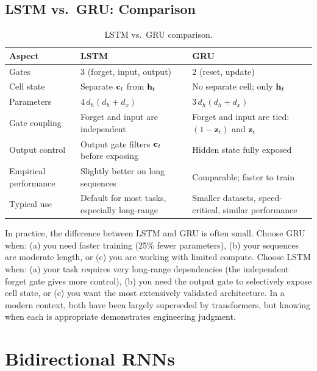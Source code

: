 \subsection{LSTM vs.\ GRU: Comparison}

\begin{table}[H]
\centering
\caption{LSTM vs.\ GRU comparison.}
\label{tab:lstm_gru}
\begin{tabularx}{\textwidth}{lXX}
\toprule
\textbf{Aspect} & \textbf{LSTM} & \textbf{GRU} \\
\midrule
Gates & 3 (forget, input, output) & 2 (reset, update) \\
Cell state & Separate $\mathbf{c}_t$ from $\mathbf{h}_t$ & No separate cell; only $\mathbf{h}_t$ \\
Parameters & $4\,d_h(d_h + d_x)$ & $3\,d_h(d_h + d_x)$ \\
Gate coupling & Forget and input are independent & Forget and input are tied: $(1-\mathbf{z}_t)$ and $\mathbf{z}_t$ \\
Output control & Output gate filters $\mathbf{c}_t$ before exposing & Hidden state fully exposed \\
Empirical performance & Slightly better on long sequences & Comparable; faster to train \\
Typical use & Default for most tasks, especially long-range & Smaller datasets, speed-critical, similar performance \\
\bottomrule
\end{tabularx}
\end{table}

\begin{keyinsight}
In practice, the difference between LSTM and GRU is often small.  Choose GRU
when: (a) you need faster training (25\% fewer parameters), (b) your
sequences are moderate length, or (c) you are working with limited compute.
Choose LSTM when: (a) your task requires very long-range dependencies (the
independent forget gate gives more control), (b) you need the output gate to
selectively expose cell state, or (c) you want the most extensively validated
architecture.  In a modern context, both have been largely superseded by
transformers, but knowing when each is appropriate demonstrates engineering
judgment.
\end{keyinsight}


\section{Bidirectional RNNs}
\label{sec:birnn}

